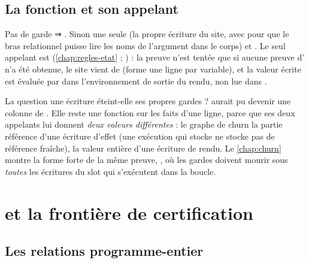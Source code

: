 \subsection{La fonction et son appelant}


Pas de garde ⇒ . Sinon une seule  (la propre écriture du site, avec  pour que le bras relationnel puisse lire les noms de l'argument dans le corps) et . Le seul appelant est  (\cref{chap:regles-etat} ; ) : la preuve n'est tentée que si aucune preuve d'\Error{} n'a été obtenue, le site vient de  (forme \og une ligne par variable\fg{}), et la valeur écrite est évaluée par  dans l'environnement de sortie du rendu, non lue dans .

\begin{decision}
La question \og une écriture éteint-elle ses propres gardes ?\fg{} aurait pu devenir une colonne  de . Elle reste une fonction sur les faits d'une ligne, parce que ses deux appelants lui donnent \emph{deux valeurs différentes} : le graphe de churn la partie référence d'une écriture d'effet (une exécution qui stocke  ne stocke pas de référence fraîche),  la valeur entière d'une écriture de rendu. Le \cref{chap:churn} montre la forme forte de la même preuve, , où les gardes doivent mourir sous \emph{toutes} les écritures du slot qui s'exécutent dans la boucle.
\end{decision}

\section{ et la frontière de certification}
\label{sec:relations-frontiere}
\subsection{Les relations programme-entier}


